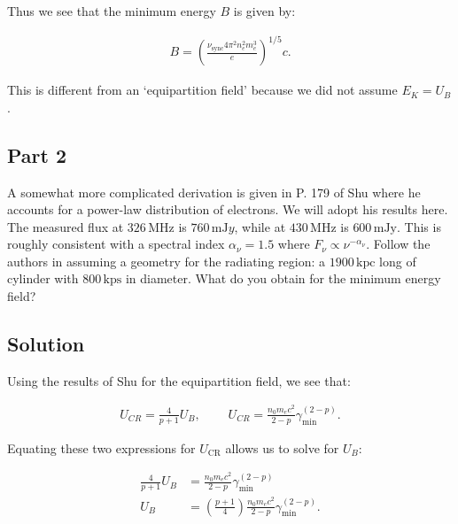 \documentclass[12pt]{article}
\begin{document}
{\noindent}Thus we see that the minimum energy $B$ is given by:

\begin{align*}
    \boxed{B = \left(\frac{\nu_\mathrm{sync}4\pi^2 n_e^2 m_e^3}{e}\right)^{1/5} c}.
\end{align*}

This is different from an `equipartition field' because we did not assume $E_K = U_B$.


\subsection*{Part 2}

A somewhat more complicated derivation is given in P. 179 of Shu where he accounts for a power-law distribution of electrons. We will adopt his results here. The measured flux at $326\,\mathrm{MHz}$ is $760\,\mathrm{mJ}y$, while at $430\,\mathrm{MHz}$ is $600\,\mathrm{mJy}$. This is roughly consistent with a spectral index $\alpha_\nu = 1.5$ where $F_\nu \propto \nu^{-\alpha_\nu}$. Follow the authors in assuming a geometry for the radiating region: a $1900\,\mathrm{kpc}$ long of cylinder with $800\,\mathrm{kps}$ in diameter. What do you obtain for the minimum energy field?


\subsection*{Solution}

Using the results of Shu for the equipartition field, we see that:

\begin{align*}
    U_{CR} = \frac{4}{p+1}U_B, ~~~~~~~~~~ U_{CR} = \frac{n_0m_ec^2}{2-p}\gamma_\mathrm{min}^{(2-p)}.
\end{align*}

{\noindent}Equating these two expressions for $U_\mathrm{CR}$ allows us to solve for $U_B$:

\begin{align*}
    \frac{4}{p+1}U_B &= \frac{n_0m_ec^2}{2-p}\gamma_\mathrm{min}^{(2-p)} \\
    U_B &= \left(\frac{p+1}{4}\right)\frac{n_0m_ec^2}{2-p}\gamma_\mathrm{min}^{(2-p)}.
\end{align*}
\end{document}
